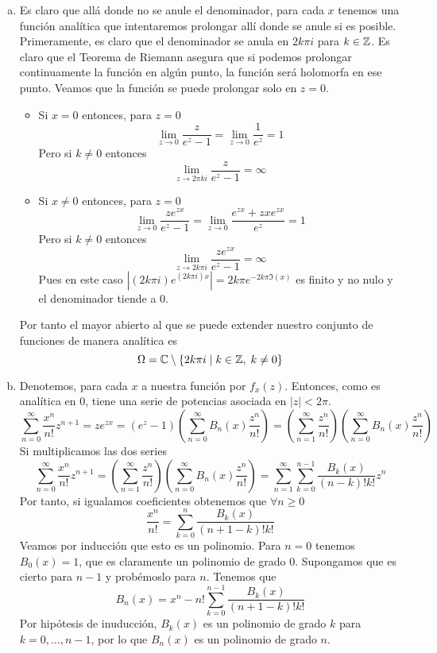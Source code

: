 \documentclass[twoside]{article}
\begin{document}
\begin{solucion}
\begin{enumerate}[(a)]
\item Es claro que allá donde no se anule el denominador, para cada $x$ tenemos una función analítica que intentaremos prolongar allí donde se anule si es posible. Primeramente, es claro que el denominador se anula en $2k\pi i$ para $k\in \mathbb{Z}$. Es claro que el Teorema de Riemann asegura que si podemos prolongar continuamente la función en algún punto, la función será holomorfa en ese punto. Veamos que la función se puede prolongar solo en $z=0$.
\begin{itemize}
\item Si $x=0$ entonces, para $z=0$
$$
\lim_{z\to 0}\frac{z}{e^z-1} = \lim_{z\to 0}\frac{1}{e^z} = 1
$$
Pero si $k\neq 0$ entonces
$$
\lim_{z\to 2\pi k i}\frac{z}{e^z-1} = \infty
$$
\item Si $x\neq 0$ entonces, para $z=0$
$$
\lim_{z\to 0}\frac{ze^{zx}}{e^z-1} = \lim_{z\to 0}\frac{e^{zx}+zxe^{zx}}{e^z} = 1
$$
Pero si $k\neq 0$ entonces
$$
\lim_{z\to 2k\pi i}\frac{ze^{zx}}{e^z-1} = \infty
$$
Pues en este caso $|(2k\pi i)e^{(2k\pi i)x}| = 2k\pi e^{-2k\pi \Im(x)}$ es finito y no nulo y el denominador tiende a $0$.
\end{itemize}
Por tanto el mayor abierto al que se puede extender nuestro conjunto de funciones de manera analítica es
$$
\Omega = \mathbb{C}\setminus\{2k\pi i \mid k\in \mathbb{Z},\; k\neq 0\}
$$
\item Denotemos, para cada $x$ a nuestra función por $f_x(z)$. Entonces, como es analítica en $0$, tiene una serie de potencias asociada en $|z|<2\pi$. 
\[ \sum_{n=0}^\infty \frac{x^n}{n!}z^{n+1}= z e^{zx} =(e^z-1) \left(\sum_{n=0}^\infty B_n(x) \frac{z^n}{n!}\right)=\left( \sum_{n=1}^\infty \frac{z^n}{n!}\right)\left(\sum_{n=0}^\infty B_n(x) \frac{z^n}{n!}\right)\]
Si multiplicamos las dos series
\[ \sum_{n=0}^\infty \frac{x^n}{n!}z^{n+1}= \left( \sum_{n=1}^\infty \frac{z^n}{n!}\right)\left(\sum_{n=0}^\infty B_n(x) \frac{z^n}{n!}\right) = \sum_{n=1}^\infty\sum_{k=0}^{n-1}\frac{B_k(x)}{(n-k)!k!} z^n \]
Por tanto, si igualamos coeficientes obtenemos que $\forall n\geq 0$
$$
\frac{x^{n}}{n!} = \sum_{k=0}^{n} \frac{B_k(x)}{(n+1-k)!k!}
$$
Veamos por inducción que esto es un polinomio. Para $n=0$ tenemos $B_0(x) = 1$, que es claramente un polinomio de grado $0$. Supongamos que es cierto para $n-1$ y probémoslo para $n$. Tenemos que
$$
B_n(x) = x^n - n!\sum_{k=0}^{n-1} \frac{B_k(x)}{(n+1-k)!k!}
$$
Por hipótesis de inuducción, $B_k(x)$ es un polinomio de grado $k$ para $k=0,\dotsc,n-1$, por lo que $B_n(x)$ es un polinomio de grado $n$.

\end{enumerate}
\end{solucion}
\end{document}

